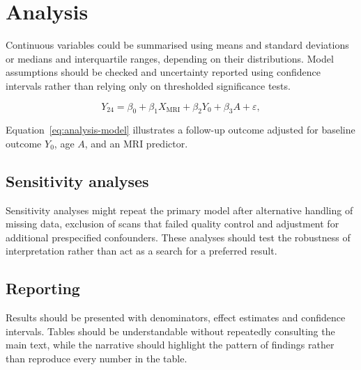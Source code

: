 \section{Analysis}
Continuous variables could be summarised using means and standard deviations or
medians and interquartile ranges, depending on their distributions. Model
assumptions should be checked and uncertainty reported using confidence
intervals rather than relying only on thresholded significance tests.

\begin{equation}
  Y_{24} = \beta_0 + \beta_1 X_{\mathrm{MRI}}
           + \beta_2 Y_0 + \beta_3 A + \varepsilon,
  \label{eq:analysis-model}
\end{equation}

Equation~\ref{eq:analysis-model} illustrates a follow-up outcome adjusted for
baseline outcome \(Y_0\), age \(A\), and an MRI predictor.

\subsection{Sensitivity analyses}
Sensitivity analyses might repeat the primary model after alternative handling
of missing data, exclusion of scans that failed quality control and adjustment
for additional prespecified confounders. These analyses should test the
robustness of interpretation rather than act as a search for a preferred
result.

\subsection{Reporting}
Results should be presented with denominators, effect estimates and confidence
intervals. Tables should be understandable without repeatedly consulting the
main text, while the narrative should highlight the pattern of findings rather
than reproduce every number in the table.
